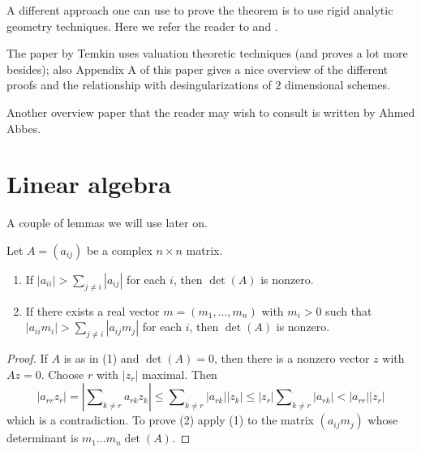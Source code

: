 \medskip\noindent
A different approach one can use to prove the theorem is to use
rigid analytic geometry techniques. Here we refer the reader to
\cite{vanderPut} and \cite{Arzdorf-Wewers}.

\medskip\noindent
The paper \cite{Temkin} by Temkin uses valuation theoretic techniques
(and proves a lot more besides); also Appendix A of this paper gives
a nice overview of the different proofs and the relationship with
desingularizations of $2$ dimensional schemes.

\medskip\noindent
Another overview paper that the reader may wish to consult is
\cite{Abbes-ssr} written by Ahmed Abbes.






\section{Linear algebra}
\label{section-linear-algebra}

\noindent
A couple of lemmas we will use later on.

\begin{lemma}
\label{lemma-recurring}
\begin{reference}
\cite[Theorem I]{Taussky}
\end{reference}
Let $A = (a_{ij})$ be a complex $n \times n$ matrix.
\begin{enumerate}
\item If $|a_{ii}| > \sum_{j \not = i} |a_{ij}|$ for each $i$, then
$\det(A)$ is nonzero.
\item If there exists a real vector $m = (m_1, \ldots, m_n)$
with $m_i > 0$ such that $|a_{ii} m_i| > \sum_{j \not = i} |a_{ij}m_j|$
for each $i$, then $\det(A)$ is nonzero.
\end{enumerate}
\end{lemma}

\begin{proof}
If $A$ is as in (1) and $\det(A) = 0$, then there is a nonzero vector
$z$ with $Az = 0$. Choose $r$ with $|z_r|$ maximal. Then
$$
|a_{rr} z_r| = |\sum\nolimits_{k \not = r} a_{rk}z_k| \leq
\sum\nolimits_{k \not = r} |a_{rk}||z_k| \leq
|z_r| \sum\nolimits_{k \not = r} |a_{rk}| < |a_{rr}||z_r|
$$
which is a contradiction. To prove (2) apply (1) to the matrix
$(a_{ij}m_j)$ whose determinant is $m_1 \ldots m_n \det(A)$.
\end{proof}

